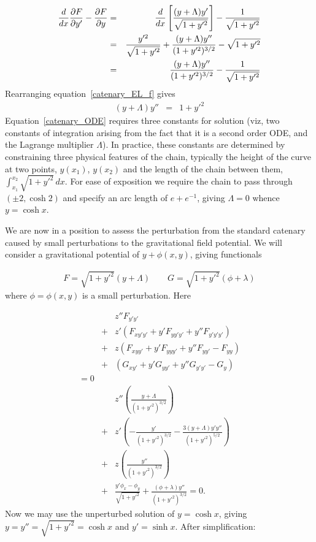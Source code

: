 \documentclass[pdflatex,sn-mathphys-num]{sn-jnl}%
\theoremstyle{thmstyleone}%
\theoremstyle{thmstyletwo}%
\theoremstyle{thmstylethree}%
\begin{document}
\begin{eqnarray}
  \frac{d}{dx}\frac{\partial{F}}{\partial{y'}} - \frac{\partial{F}}{\partial{y}}
  &=& 
  \frac{d}{dx}\left[\frac{(y+\Lambda)y'}{\sqrt{1+y'^2}}\right] -  \frac{1}{\sqrt{1+y'^2}}\nonumber\\
&=&   \frac{y'^2}{\sqrt{1+y'^2}} + \frac{(y+\Lambda)y''}{(1+y'^2)^{3/2}} - \sqrt{1+y'^2}\nonumber\\
  &=&   \frac{(y+\Lambda)y''}{(1+y'^2)^{3/2}} - \frac{1}{\sqrt{1+y'^2}}
  \label{catenary_EL_f}
\end{eqnarray}
%
Rearranging equation~\ref{catenary_EL_f} gives
%
\begin{eqnarray}
  (y+\Lambda)y'' &=& 1+y'^2\label{catenary_ODE}
\end{eqnarray}
%
Equation~\ref{catenary_ODE} requires three constants for solution
(viz, two constants of integration arising from the fact that it is a
second order ODE, and the Lagrange multiplier $\Lambda$).  In
practice, these constants are determined by constraining three
physical features of the chain, typically the height of the curve at
two points, $y(x_1)$, $y(x_2)$ and the length of the chain between
them, $\int_{x_1}^{x_2}\sqrt{1+y'^2}\,dx$.  For ease of exposition we
require the chain to pass through $(\pm 2,\cosh 2)$ and specify an arc
length of $e+e^{-1}$, giving $\Lambda=0$ whence $y=\cosh x$.

We are now in a position to assess the perturbation from the standard
catenary caused by small perturbations to the gravitational field
potential.  We will consider a gravitational potential of $y +
\phi(x,y)$, giving functionals

\begin{eqnarray}\label{FandG}
F = \sqrt{1+y'^2}(y + \Lambda)\qquad G =  \sqrt{1+y'^2}(\phi + \lambda)
\end{eqnarray}
%
where $\phi=\phi(x,y)$ is a small perturbation.  Here 

\begin{eqnarray}
&{}& z''F_{y'y'}\nonumber\\
&+& z'(F_{xy'y'} + y'F_{yy'y'} + y''F_{y'y'y'})\nonumber\\
&+& z (F_{xyy'} + y'F_{yyy'} + y''F_{yy'}-F_{yy})\nonumber\\
&+& (G_{xy'} + y'G_{yy'} + y''G_{y'y'}- G_{y})\nonumber\\
= 0\\
&{}&  z''\left(\frac{y+\Lambda}{(1+y'^2)^{3/2}}\right)\nonumber\\
&+& z' \left(-\frac{y'}{(1+y'^2)^{3/2}} -\frac{3(y+\Lambda)y'y''}{(1+y'^2)^{5/2}}\right)\nonumber\\
&+& z  \left(\frac{y''}{(1+y'^2)^{3/2}}\right)\nonumber\\
&+& \frac{y'\phi_x-\phi_y}{\sqrt{1+y'^2}} + \frac{(\phi+\lambda)y''}{(1+y'^2)^{3/2}} = 0.
\end{eqnarray}
%
Now we may use the unperturbed solution of $y=\cosh x$, giving
$y=y''=\sqrt{1+y'^2}=\cosh x$ and $y'=\sinh x$.  After simplification:
\end{document}
